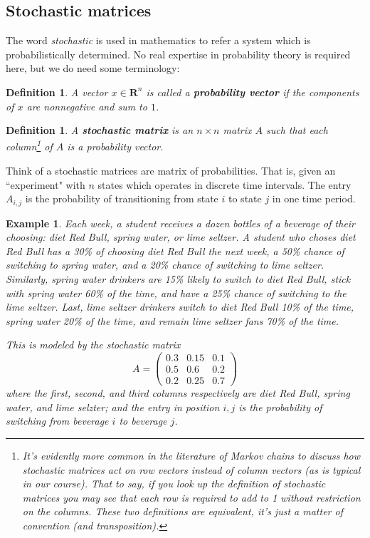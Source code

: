 \documentclass[12pt]{article}
\numberwithin{equation}{subsection}
\numberwithin{figure}{subsection}
\newtheorem{defn}[subsection]{Definition}
\theoremstyle{note}
\newtheorem{example}[subsection]{Example}
\newcommand{\R}{\mathbf{R}}
\begin{document}
\subsection{Stochastic matrices}
The word \textit{stochastic} is used in mathematics to refer a system which is probabilistically determined. No real expertise in probability theory is required here, but we do need some terminology: 

\begin{defn}A vector $x\in \R^n$ is called a \textbf{probability vector} if the components of $x$ are nonnegative and sum to $1$. \end{defn}

\begin{defn}A \textbf{stochastic matrix} is an $n\times n$ matrix $A$ such that each column\footnote{It's evidently more common in the literature of Markov chains to discuss how stochastic matrices act on \textit{row} vectors instead of \textit{column} vectors (as is typical in our course). That to say, if you look up the definition of stochastic matrices you may see that each \textit{row} is required to add to 1 without restriction on the columns. These two definitions are equivalent, it's just a matter of convention (and transposition). } of $A$ is a probability vector. 
\end{defn}

Think of a stochastic matrices are matrix of probabilities. That is, given an ``experiment" with $n$ states which operates in discrete time intervals. The entry $A_{i,j}$ is the probability of transitioning from state $i$ to state $j$ in one time period. 

\begin{example} \label{ex-redbull}
Each week, a student receives a dozen bottles of a beverage of their choosing: diet Red Bull, spring water, or lime seltzer. A student who choses diet Red Bull has a 30\% of choosing diet Red Bull the next week, a 50\% chance of switching to spring water, and a 20\% chance of switching to lime seltzer. Similarly, spring water drinkers are 15\% likely to switch to diet Red Bull, stick with spring water 60\% of the time, and have a 25\% chance of switching to the lime seltzer. Last, lime seltzer drinkers switch to diet Red Bull 10\% of the time, spring water 20\% of the time, and remain lime seltzer fans 70\% of the time. 

This is modeled by the stochastic matrix \begin{equation} A=\begin{pmatrix} 0.3 &0.15  & 0.1 \\ 0.5 & 0.6 & 0.2 \\ 0.2 & 0.25 & 0.7\end{pmatrix}\end{equation} where the first, second, and third columns respectively are diet Red Bull, spring water, and lime selzter; and the entry in position $i,j$ is the probability of switching from beverage $i$ to beverage $j$.
\end{example}
\end{document}
